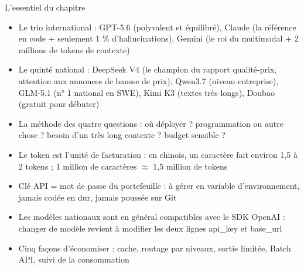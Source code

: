 \begin{tcbsummary}{L'essentiel du chapitre}
\begin{itemize}
  \item Le trio international : GPT-5.6 (polyvalent et équilibré), Claude (la référence en code + seulement 1 \% d'hallucinations), Gemini (le roi du multimodal + 2 millions de tokens de contexte)
  \item Le quinté national : DeepSeek V4 (le champion du rapport qualité-prix, attention aux annonces de hausse de prix), Qwen3.7 (niveau entreprise), GLM-5.1 (n° 1 national en SWE), Kimi K3 (textes très longs), Doubao (gratuit pour débuter)
  \item La méthode des quatre questions : où déployer ? programmation ou autre chose ? besoin d'un très long contexte ? budget sensible ?
  \item Le token est l'unité de facturation : en chinois, un caractère fait environ 1,5 à 2 tokens ; 1 million de caractères $\approx$ 1,5 million de tokens
  \item Clé API = mot de passe du portefeuille : à gérer en variable d'environnement, jamais codée en dur, jamais poussée sur Git
  \item Les modèles nationaux sont en général compatibles avec le SDK OpenAI : changer de modèle revient à modifier les deux lignes api\_key et base\_url
  \item Cinq façons d'économiser : cache, routage par niveaux, sortie limitée, Batch API, suivi de la consommation
\end{itemize}

\end{tcbsummary}
